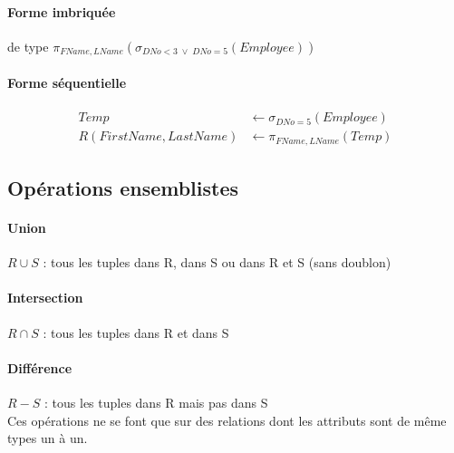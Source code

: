 \documentclass[a4paper]{article}
\begin{document}
  \paragraph{Forme imbriquée} de type $ \pi_{FName, LName}(\sigma_{DNo<3\; \lor\; DNo=5 }(Employee))$

  \paragraph{Forme séquentielle}
  \begin{align*}
    Temp &\leftarrow \sigma_{DNo=5}(Employee)\\
    R(FirstName, LastName) &\leftarrow \pi_{FName, LName}(Temp)
  \end{align*}

  \subsection{Opérations ensemblistes}

  \paragraph{Union} $R \cup S$ : tous les tuples dans R, dans S ou dans R et S (sans doublon)

  \paragraph{Intersection} $R \cap S$ : tous les tuples dans R et dans S

  \paragraph{Différence} $R - S$ : tous les tuples dans R mais pas dans S\\

  Ces opérations ne se font que sur des relations dont les attributs sont
  de même types un à un.
  
\end{document}
